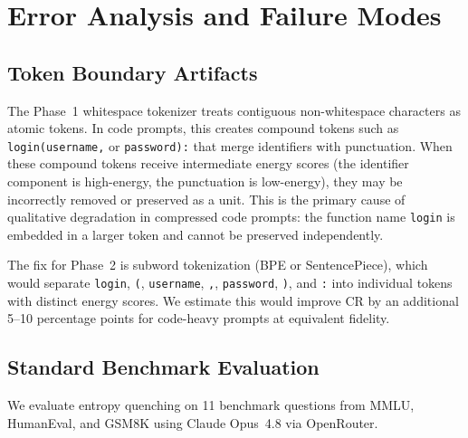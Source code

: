 \documentclass[11pt]{article}
\theoremstyle{remark}
\begin{document}
\section{Error Analysis and Failure Modes}
\label{sec:errors}

\subsection{Token Boundary Artifacts}

The Phase~1 whitespace tokenizer treats contiguous non-whitespace characters
as atomic tokens. In code prompts, this creates compound tokens such as
\texttt{login(username,} or \texttt{password):} that merge identifiers
with punctuation. When these compound tokens receive intermediate energy
scores (the identifier component is high-energy, the punctuation is
low-energy), they may be incorrectly removed or preserved as a unit.
This is the primary cause of qualitative degradation in compressed code
prompts: the function name \texttt{login} is embedded in a larger token
and cannot be preserved independently.

The fix for Phase~2 is subword tokenization (BPE or SentencePiece), which
would separate \texttt{login}, \texttt{(}, \texttt{username}, \texttt{,},
\texttt{password}, \texttt{)}, and \texttt{:} into individual tokens
with distinct energy scores. We estimate this would improve CR by an
additional 5--10 percentage points for code-heavy prompts at equivalent
fidelity.

\subsection{Standard Benchmark Evaluation}

We evaluate entropy quenching on 11 benchmark questions from MMLU,
HumanEval, and GSM8K using Claude Opus~4.8 via OpenRouter.
\end{document}
